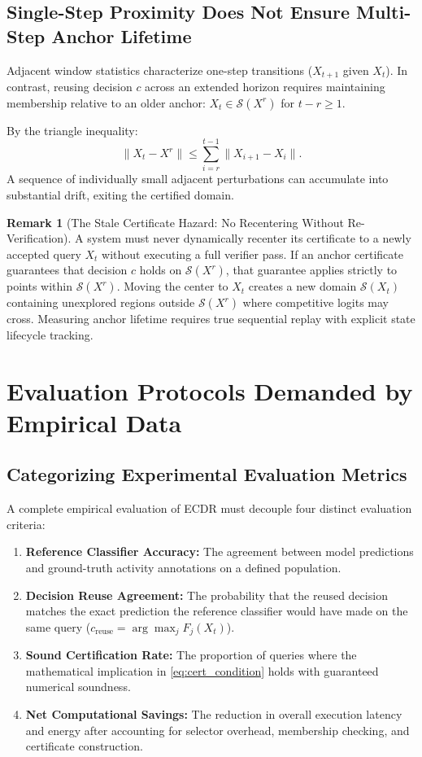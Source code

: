 \documentclass[11pt,a4paper]{article}
\theoremstyle{definition}
\newtheorem{remark}[proposition]{Remark}
\begin{document}
\subsection{Single-Step Proximity Does Not Ensure Multi-Step Anchor Lifetime}
Adjacent window statistics characterize one-step transitions ($X_{t+1}$ given $X_t$). In contrast, reusing decision $c$ across an extended horizon requires maintaining membership relative to an older anchor: $X_{t} \in \mathcal{S}(X^r)$ for $t - r \ge 1$.

By the triangle inequality:
\begin{equation}
\|X_t - X^r\| \le \sum_{i=r}^{t-1} \|X_{i+1} - X_i\|.
\end{equation}
A sequence of individually small adjacent perturbations can accumulate into substantial drift, exiting the certified domain.

\begin{remark}[The Stale Certificate Hazard: No Recentering Without Re-Verification]
A system must never dynamically recenter its certificate to a newly accepted query $X_t$ without executing a full verifier pass. If an anchor certificate guarantees that decision $c$ holds on $\mathcal{S}(X^r)$, that guarantee applies strictly to points within $\mathcal{S}(X^r)$. Moving the center to $X_t$ creates a new domain $\mathcal{S}(X_t)$ containing unexplored regions outside $\mathcal{S}(X^r)$ where competitive logits may cross. Measuring anchor lifetime requires true sequential replay with explicit state lifecycle tracking.
\end{remark}

\section{Evaluation Protocols Demanded by Empirical Data}

\subsection{Categorizing Experimental Evaluation Metrics}
A complete empirical evaluation of ECDR must decouple four distinct evaluation criteria:
\begin{enumerate}
\item \textbf{Reference Classifier Accuracy:} The agreement between model predictions and ground-truth activity annotations on a defined population.
\item \textbf{Decision Reuse Agreement:} The probability that the reused decision matches the exact prediction the reference classifier would have made on the same query ($c_{\text{reuse}} = \arg\max_j F_j(X_t)$).
\item \textbf{Sound Certification Rate:} The proportion of queries where the mathematical implication in \eqref{eq:cert_condition} holds with guaranteed numerical soundness.
\item \textbf{Net Computational Savings:} The reduction in overall execution latency and energy after accounting for selector overhead, membership checking, and certificate construction.
\end{enumerate}
\end{document}
